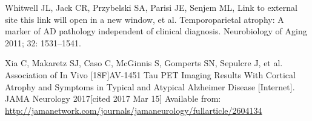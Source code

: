 \documentclass[]{article}
\begin{document}
\hypertarget{ref-whitwell_temporoparietal_2011}{}
Whitwell JL, Jack CR, Przybelski SA, Parisi JE, Senjem ML, Link to
external site this link will open in a new window, et al.
Temporoparietal atrophy: A marker of AD pathology independent of
clinical diagnosis. Neurobiology of Aging 2011; 32: 1531--1541.

\hypertarget{ref-xia_association_2017}{}
Xia C, Makaretz SJ, Caso C, McGinnis S, Gomperts SN, Sepulcre J, et al.
Association of In Vivo {[}18F{]}AV-1451 Tau PET Imaging Results With
Cortical Atrophy and Symptoms in Typical and Atypical Alzheimer Disease
{[}Internet{]}. JAMA Neurology 2017{[}cited 2017 Mar 15{]} Available
from:
\url{http://jamanetwork.com/journals/jamaneurology/fullarticle/2604134}
\end{document}
